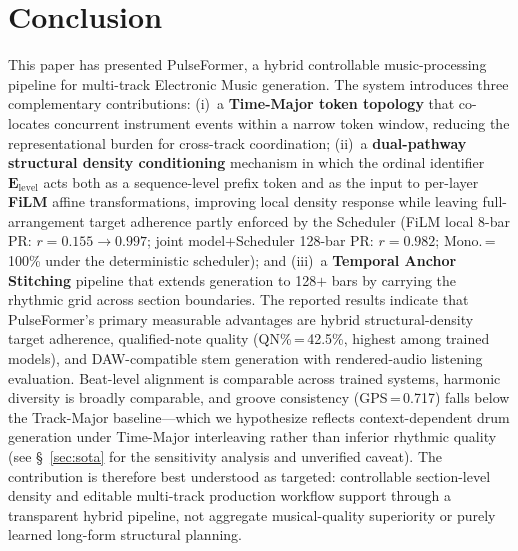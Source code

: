 \documentclass[pdflatex,sn-mathphys-num,twocolumn]{sn-jnl}
\theoremstyle{thmstyleone}
\theoremstyle{thmstyletwo}
\begin{document}
\section{Conclusion}
\label{sec:conclusion}
This paper has presented PulseFormer, a hybrid controllable music-processing pipeline for multi-track Electronic Music generation. The system introduces three complementary contributions: (i)~a \textbf{Time-Major token topology} that co-locates concurrent instrument events within a narrow token window, reducing the representational burden for cross-track coordination; (ii)~a \textbf{dual-pathway structural density conditioning} mechanism in which the ordinal identifier $\mathbf{E}_{\mathrm{level}}$ acts both as a sequence-level prefix token and as the input to per-layer \textbf{FiLM} affine transformations, improving local density response while leaving full-arrangement target adherence partly enforced by the Scheduler (FiLM local 8-bar PR: $r=0.155 \to 0.997$; joint model+Scheduler 128-bar PR: $r=0.982$; Mono.\,=\,100\% under the deterministic scheduler); and (iii)~a \textbf{Temporal Anchor Stitching} pipeline that extends generation to 128$+$ bars by carrying the rhythmic grid across section boundaries. The reported results indicate that PulseFormer's primary measurable advantages are hybrid structural-density target adherence, qualified-note quality (QN\%\,=\,42.5\%, highest among trained models), and DAW-compatible stem generation with rendered-audio listening evaluation. Beat-level alignment is comparable across trained systems, harmonic diversity is broadly comparable, and groove consistency (GPS\,=\,0.717) falls below the Track-Major baseline---which we hypothesize reflects context-dependent drum generation under Time-Major interleaving rather than inferior rhythmic quality (see \S~\ref{sec:sota} for the sensitivity analysis and unverified caveat). The contribution is therefore best understood as targeted: controllable section-level density and editable multi-track production workflow support through a transparent hybrid pipeline, not aggregate musical-quality superiority or purely learned long-form structural planning.
\end{document}
